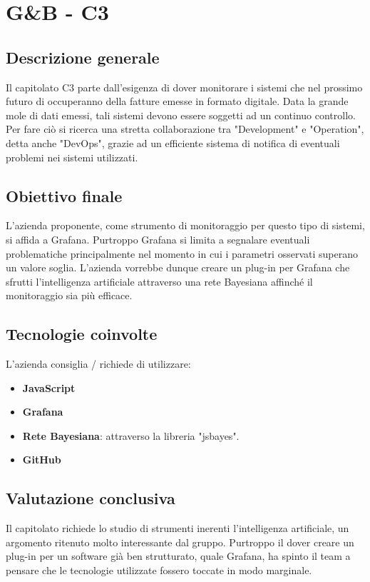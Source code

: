 \section{G\&B - C3} \label{c3}
    \subsection{Descrizione generale}
    Il capitolato C3 parte dall'esigenza di dover monitorare i sistemi che nel prossimo futuro di occuperanno della fatture emesse in formato digitale. Data la grande mole di dati emessi, tali sistemi devono essere soggetti ad un continuo controllo. Per fare ciò si ricerca una stretta collaborazione tra "Development" e "Operation", detta anche "DevOps", grazie ad un efficiente sistema di notifica di eventuali problemi nei sistemi utilizzati.

    \subsection{Obiettivo finale}
    L'azienda proponente, come strumento di monitoraggio per questo tipo di sistemi, si affida a Grafana. Purtroppo Grafana si limita a segnalare eventuali problematiche principalmente nel momento in cui i parametri osservati superano un valore soglia. L'azienda vorrebbe dunque creare un plug-in per Grafana che sfrutti l'intelligenza artificiale attraverso una rete Bayesiana affinché il monitoraggio sia più efficace.

    \subsection{Tecnologie coinvolte}
    L'azienda consiglia / richiede di utilizzare:
    \begin{itemize}
    	\item \textbf{JavaScript}
    	\item \textbf{Grafana}
    	\item \textbf{Rete Bayesiana}: attraverso la libreria "jsbayes".
    	\item \textbf{GitHub}
    \end{itemize}

    \subsection{Valutazione conclusiva}
    Il capitolato richiede lo studio di strumenti inerenti l'intelligenza artificiale, un argomento ritenuto molto interessante dal gruppo. Purtroppo il dover creare un plug-in per un software già ben strutturato, quale Grafana, ha spinto il team a pensare che le tecnologie utilizzate fossero toccate in modo marginale.
